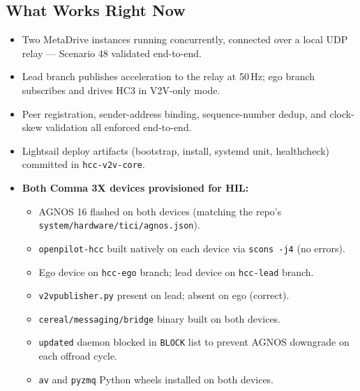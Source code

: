 \documentclass[12pt]{article}
\begin{document}
\subsection{What Works Right Now}
\begin{itemize}
  \item Two MetaDrive instances running concurrently, connected over a local UDP relay --- Scenario 48 validated end-to-end.
  \item Lead branch publishes acceleration to the relay at 50\,Hz; ego branch subscribes and drives HC3 in V2V-only mode.
  \item Peer registration, sender-address binding, sequence-number dedup, and clock-skew validation all enforced end-to-end.
  \item Lightsail deploy artifacts (bootstrap, install, systemd unit, healthcheck) committed in \texttt{hcc-v2v-core}.
  \item \textbf{Both Comma 3X devices provisioned for HIL:}
    \begin{itemize}
      \item AGNOS 16 flashed on both devices (matching the repo's \texttt{system/hardware/tici/agnos.json}).
      \item \texttt{openpilot-hcc} built natively on each device via \texttt{scons -j4} (no errors).
      \item Ego device on \texttt{hcc-ego} branch; lead device on \texttt{hcc-lead} branch.
      \item \texttt{v2vpublisher.py} present on lead; absent on ego (correct).
      \item \texttt{cereal/messaging/bridge} binary built on both devices.
      \item \texttt{updated} daemon blocked in \texttt{BLOCK} list to prevent AGNOS downgrade on each offroad cycle.
      \item \texttt{av} and \texttt{pyzmq} Python wheels installed on both devices.
    \end{itemize}
\end{itemize}
\end{document}
